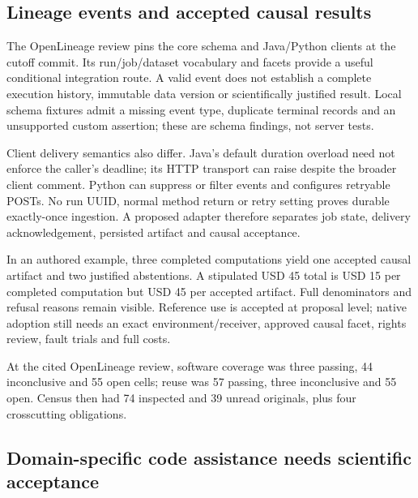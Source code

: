 \hypertarget{lineage-events-and-accepted-causal-results}{%
\subsection{Lineage events and accepted causal
results}\label{lineage-events-and-accepted-causal-results}}

The OpenLineage review pins the core schema and Java/Python clients at
the cutoff commit. Its run/job/dataset vocabulary and facets provide a
useful conditional integration route. A valid event does not establish a
complete execution history, immutable data version or scientifically
justified result. Local schema fixtures admit a missing event type,
duplicate terminal records and an unsupported custom assertion; these
are schema findings, not server tests.
\citep{exec24_openlineage_source,exec24_openlineage_reference}

Client delivery semantics also differ. Java's default duration overload
need not enforce the caller's deadline; its HTTP transport can raise
despite the broader client comment. Python can suppress or filter events
and configures retryable POSTs. No run UUID, normal method return or
retry setting proves durable exactly-once ingestion. A proposed adapter
therefore separates job state, delivery acknowledgement, persisted
artifact and causal acceptance. \citep{exec24_openlineage_source}

In an authored example, three completed computations yield one accepted
causal artifact and two justified abstentions. A stipulated USD 45 total
is USD 15 per completed computation but USD 45 per accepted artifact.
Full denominators and refusal reasons remain visible. Reference use is
accepted at proposal level; native adoption still needs an exact
environment/receiver, approved causal facet, rights review, fault trials
and full costs. \citep{exec24_openlineage_reference}

At the cited OpenLineage review, software coverage was three passing, 44
inconclusive and 55 open cells; reuse was 57 passing, three inconclusive
and 55 open. Census then had 74 inspected and 39 unread originals, plus
four crosscutting obligations.
\citep{sp24openlineage_reader,sp24openlineage_progress}

\hypertarget{domain-specific-code-assistance-needs-scientific-acceptance}{%
\subsection{Domain-specific code assistance needs scientific
acceptance}\label{domain-specific-code-assistance-needs-scientific-acceptance}}

